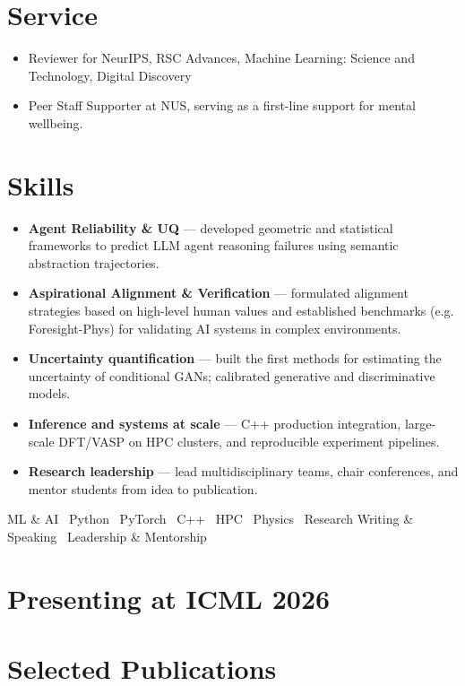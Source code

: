 \documentclass[11pt,a4paper]{article}
\begin{document}
\section{Service}
\begin{itemize}
  \item Reviewer for NeurIPS, RSC Advances, Machine Learning: Science and Technology, Digital Discovery
  \item Peer Staff Supporter at NUS, serving as a first-line support for mental wellbeing.
\end{itemize}

\newpage

\section{Skills}
\begin{itemize}
  \item \textbf{Agent Reliability \& UQ} --- developed geometric and statistical frameworks to predict LLM agent reasoning failures using semantic abstraction trajectories.
  \item \textbf{Aspirational Alignment \& Verification} --- formulated alignment strategies based on high-level human values and established benchmarks (e.g. Foresight-Phys) for validating AI systems in complex environments.
  \item \textbf{Uncertainty quantification} --- built the first methods for estimating the uncertainty of conditional GANs; calibrated generative and discriminative models.
  \item \textbf{Inference and systems at scale} --- C++ production integration, large-scale DFT/VASP on HPC clusters, and reproducible experiment pipelines.
  \item \textbf{Research leadership} --- lead multidisciplinary teams, chair conferences, and mentor students from idea to publication.
\end{itemize}
{\small\centering ML \& AI \textbullet\ Python \textbullet\ PyTorch \textbullet\ C++ \textbullet\ HPC \textbullet\ Physics \textbullet\ Research Writing \& Speaking \textbullet\ Leadership \& Mentorship\par}

\nocite{*}
\section{Presenting at ICML 2026}
\printbibliography[filter=cvicml,heading=none,resetnumbers=true]

\section{Selected Publications}
\printbibliography[filter=cvselected,heading=none,resetnumbers=true]
\end{document}
